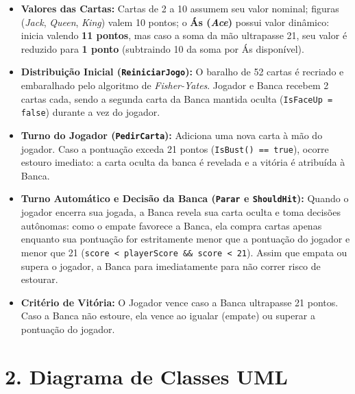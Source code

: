\documentclass[10pt,a4paper]{article}
\begin{document}
\begin{itemize}
    \item \textbf{Valores das Cartas:} Cartas de 2 a 10 assumem seu valor nominal; figuras (\textit{Jack}, \textit{Queen}, \textit{King}) valem 10 pontos; o \textbf{Ás (\textit{Ace})} possui valor dinâmico: inicia valendo \textbf{11 pontos}, mas caso a soma da mão ultrapasse 21, seu valor é reduzido para \textbf{1 ponto} (subtraindo 10 da soma por Ás disponível).
    \item \textbf{Distribuição Inicial (\texttt{ReiniciarJogo}):} O baralho de 52 cartas é recriado e embaralhado pelo algoritmo de \textit{Fisher-Yates}. Jogador e Banca recebem 2 cartas cada, sendo a segunda carta da Banca mantida oculta (\texttt{IsFaceUp = false}) durante a vez do jogador.
    \item \textbf{Turno do Jogador (\texttt{PedirCarta}):} Adiciona uma nova carta à mão do jogador. Caso a pontuação exceda 21 pontos (\texttt{IsBust() == true}), ocorre estouro imediato: a carta oculta da banca é revelada e a vitória é atribuída à Banca.
    \item \textbf{Turno Automático e Decisão da Banca (\texttt{Parar} e \texttt{ShouldHit}):} Quando o jogador encerra sua jogada, a Banca revela sua carta oculta e toma decisões autônomas: como o empate favorece a Banca, ela compra cartas apenas enquanto sua pontuação for estritamente menor que a pontuação do jogador e menor que 21 (\texttt{score < playerScore \&\& score < 21}). Assim que empata ou supera o jogador, a Banca para imediatamente para não correr risco de estourar.
    \item \textbf{Critério de Vitória:} O Jogador vence caso a Banca ultrapasse 21 pontos. Caso a Banca não estoure, ela vence ao igualar (empate) ou superar a pontuação do jogador.
\end{itemize}

\section*{2. Diagrama de Classes UML}
\end{document}
